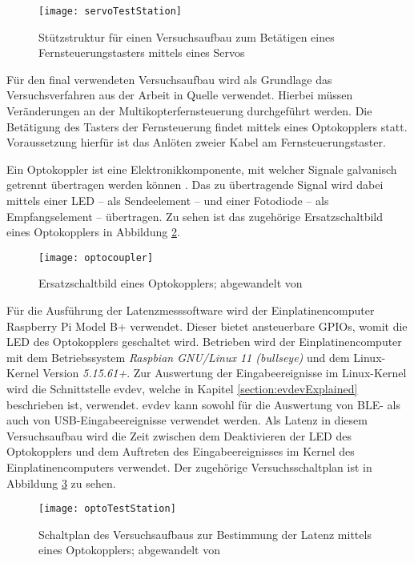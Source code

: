 \begin{figure}[H]
    \centering
    \texttt{[image: servoTestStation]}
    \caption{Stützstruktur für einen Versuchsaufbau zum Betätigen eines Fernsteuerungstasters mittels eines Servos}
    \label{fig:servoTestStation}
\end{figure}

Für den final verwendeten Versuchsaufbau wird als Grundlage das Versuchsverfahren aus der Arbeit in Quelle \cite{wimmerLatenzStation} verwendet. Hierbei müssen Veränderungen an der Multikopterfernsteuerung durchgeführt werden. Die Betätigung des Tasters der Fernsteuerung findet mittels eines Optokopplers statt. Voraussetzung hierfür ist das Anlöten zweier Kabel am Fernsteuerungstaster.

Ein Optokoppler ist eine Elektronikkomponente, mit welcher Signale galvanisch getrennt übertragen werden können \cite{elektronikKompendiumOptokoppler}. Das zu übertragende Signal wird dabei mittels einer \acs{LED} -- als Sendeelement -- und einer Fotodiode -- als Empfangselement -- übertragen. Zu sehen ist das zugehörige Ersatzschaltbild eines Optokopplers in Abbildung \ref{fig:optocoupler}.

\begin{figure}[H]
    \centering
    \texttt{[image: optocoupler]}
    \caption{Ersatzschaltbild eines Optokopplers; abgewandelt von \cite{altiumOptokoppler}}
    \label{fig:optocoupler}
\end{figure}

Für die Ausführung der Latenzmesssoftware wird der Einplatinencomputer Raspberry Pi Model B+ verwendet. Dieser bietet ansteuerbare \acsp{GPIO}, womit die \acs{LED} des Optokopplers geschaltet wird. Betrieben wird der Einplatinencomputer mit dem Betriebssystem \textit{Raspbian GNU/Linux 11 (bullseye)} und dem Linux-Kernel Version \textit{5.15.61+}. Zur Auswertung der Eingabeereignisse im Linux-Kernel wird die Schnittstelle evdev, welche in Kapitel \ref{section:evdevExplained} beschrieben ist, verwendet. evdev kann sowohl für die Auswertung von \ac{BLE}- als auch von USB-Eingabeereignisse verwendet werden. Als Latenz in diesem Versuchsaufbau wird die Zeit zwischen dem Deaktivieren der \acs{LED} des Optokopplers und dem Auftreten des Eingabeereignisses im Kernel des Einplatinencomputers verwendet. Der zugehörige Versuchsschaltplan ist in Abbildung \ref{fig:optoTestStation} zu sehen.

\begin{figure}[H]
    \centering
    \texttt{[image: optoTestStation]}
    \caption{Schaltplan des Versuchsaufbaus zur Bestimmung der Latenz mittels eines Optokopplers; abgewandelt von \cites{wimmerLatenzStation}[S.~8; S.~12]{LTV817}}
    \label{fig:optoTestStation}
\end{figure}

